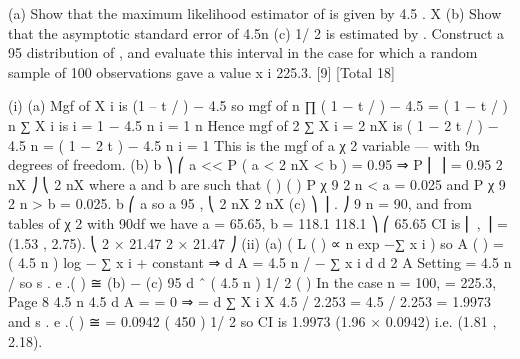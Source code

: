 \documentclass[a4paper,12pt]{article}
\begin{document}
(a) Show that the maximum likelihood estimator of
is given by
4.5
.
X
(b)
Show that the asymptotic standard error of
4.5n
(c)
1/ 2
is estimated by
.
Construct a 95%
distribution of , and evaluate this interval in the case for which a
random sample of 100 observations gave a value
x i 225.3.
[9]
[Total 18]

\newpage
(i)
(a)
Mgf of X i is (1 – t / \lambda ) − 4.5 so mgf of
n
∏ ( 1 − t / \lambda )
− 4.5
= ( 1 − t / \lambda )
n
∑ X i
is
i = 1
− 4.5 n
i = 1
n
Hence mgf of 2 \lambda ∑ X i = 2 \lambda nX is ( 1 − 2 \lambda t / \lambda )
− 4.5 n
= ( 1 − 2 t )
− 4.5 n
i = 1
This is the mgf of a χ 2 variable — with 9n degrees of freedom.
(b)
b ⎞
⎛ a
<\lambda<
P ( a < 2 \lambda nX < b ) = 0.95 ⇒ P ⎜
⎟ = 0.95
2 nX ⎠
⎝ 2 nX
where a and b are such that
(
)
(
)
P χ 9 2 n < a = 0.025 and P χ 9 2 n > b = 0.025.
b
⎛ a
so a 95%
,
⎝ 2 nX 2 nX
(c)
⎞
⎟ .
⎠
9 n = 90, and from tables of χ 2 with 90df we have a = 65.65, b = 118.1
118.1 ⎞
⎛ 65.65
CI is ⎜
,
⎟ = (1.53 , 2.75).
⎝ 2 × 21.47 2 × 21.47 ⎠
(ii)
(a)
(
L ( \lambda ) ∝  n exp −\lambda ∑ x i
)
so
A ( \lambda ) = ( 4.5 n ) log \lambda − \lambda ∑ x i + constant
⇒
d A
= 4.5 n / \lambda − ∑ x i
d \lambda
d 2 A
Setting
= 4.5 n /  so s . e .( \hat{\lambda}) ≅
(b) −
(c) 95%
d 
{
\lambda ˆ
( 4.5 n ) 1/ 2
( ) }
In the case n = 100, \sigmax = 225.3,
Page 8
4.5 n 4.5
d A
=
= 0 ⇒ \hat{\lambda}=
d \lambda
∑ X i X
4.5 / 2.253
\hat{\lambda}= 4.5 / 2.253 = 1.9973 and s . e .( \hat{\lambda}) ≅
= 0.0942
( 450 ) 1/ 2
so CI is 1.9973 \pm(1.96 × 0.0942) i.e. (1.81 , 2.18).
\end{document}
